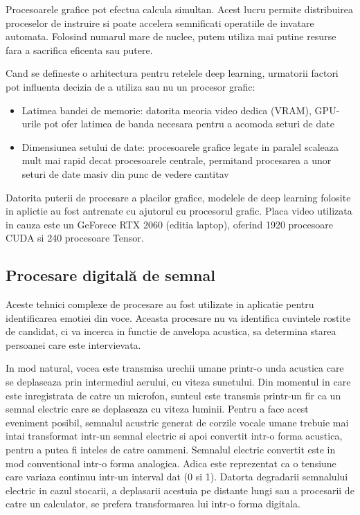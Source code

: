 \documentclass[a4paper, 12pt]{report}
\begin{document}
	Procesoarele grafice pot efectua calcula simultan. Acest lucru permite distribuirea proceselor de instruire si poate accelera semnificati operatiile de invatare automata. Folosind numarul mare de nuclee, putem utiliza mai putine resurse fara a sacrifica eficenta sau putere.
	
	Cand se defineste o arhitectura pentru retelele deep learning, urmatorii factori pot influenta decizia de a utiliza sau nu un procesor grafic:
	\begin{itemize}
		\item Latimea bandei de memorie: datorita meoria video dedica (VRAM), GPU-urile pot ofer latimea de banda necesara pentru a acomoda seturi de date
		\item Dimensiunea setului de date: procesoarele grafice legate in paralel scaleaza mult mai rapid decat procesoarele centrale, permitand procesarea a unor seturi de date masiv din punc de vedere cantitav
	\end{itemize}
	
	Datorita puterii de procesare a placilor grafice, modelele de deep learning folosite in aplictie au fost antrenate cu ajutorul cu procesorul grafic. Placa video utilizata in cauza este un GeForece RTX 2060 (editia laptop), oferind 1920 procesoare CUDA si 240 procesoare Tensor.
	\clearpage
	
	\subsection{Procesare digitală de semnal}
	Aceste tehnici complexe de procesare au fost utilizate in aplicatie pentru identificarea emotiei din voce. Aceasta procesare nu va identifica cuvintele rostite de candidat, ci va incerca in functie de anvelopa acustica, sa determina starea persoanei care este intervievata.
	
	In mod natural, vocea este transmisa urechii umane printr-o unda acustica care se deplaseaza prin intermediul aerului, cu viteza sunetului. Din momentul in care este inregistrata de catre un microfon, sunteul este transmis printr-un fir ca un semnal electric care se deplaseaza cu viteza luminii. Pentru a face acest eveniment posibil, semnalul acustric generat de corzile vocale umane trebuie mai intai transformat intr-un semnal electric si apoi convertit intr-o forma acustica, pentru a putea fi inteles de catre oammeni. Semnalul electric convertit este in mod conventional intr-o forma analogica. Adica este reprezentat ca o tensiune care variaza continuu intr-un interval dat (0 si 1). Datorta degradarii semnalului electric in cazul stocarii, a deplasarii acestuia pe distante lungi sau a procesarii de catre un calculator, se prefera transformarea lui intr-o forma digitala.
	
\end{document}
